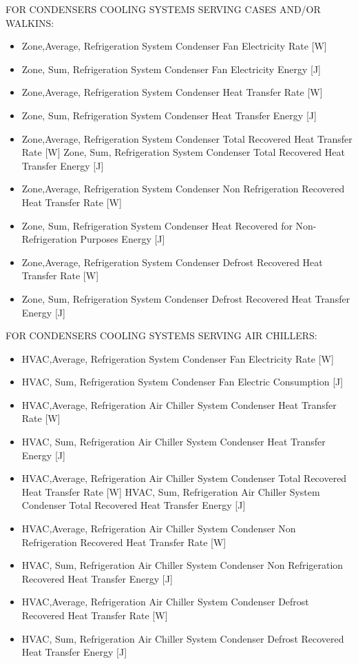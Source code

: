 FOR CONDENSERS COOLING SYSTEMS SERVING CASES AND/OR WALKINS:

\begin{itemize}
\item
  Zone,Average, Refrigeration System Condenser Fan Electricity Rate {[}W{]}
\item
  Zone, Sum, Refrigeration System Condenser Fan Electricity Energy {[}J{]}
\item
  Zone,Average, Refrigeration System Condenser Heat Transfer Rate {[}W{]}
\item
  Zone, Sum, Refrigeration System Condenser Heat Transfer Energy {[}J{]}
\item
  Zone,Average, Refrigeration System Condenser Total Recovered Heat Transfer Rate {[}W{]} Zone, Sum, Refrigeration System Condenser Total Recovered Heat Transfer Energy {[}J{]}
\item
  Zone,Average, Refrigeration System Condenser Non Refrigeration Recovered Heat Transfer Rate {[}W{]}
\item
  Zone, Sum, Refrigeration System Condenser Heat Recovered for Non-Refrigeration Purposes Energy {[}J{]}
\item
  Zone,Average, Refrigeration System Condenser Defrost Recovered Heat Transfer Rate {[}W{]}
\item
  Zone, Sum, Refrigeration System Condenser Defrost Recovered Heat Transfer Energy {[}J{]}
\end{itemize}

FOR CONDENSERS COOLING SYSTEMS SERVING AIR CHILLERS:

\begin{itemize}
\item
  HVAC,Average, Refrigeration System Condenser Fan Electricity Rate {[}W{]}
\item
  HVAC, Sum, Refrigeration System Condenser Fan Electric Consumption {[}J{]}
\item
  HVAC,Average, Refrigeration Air Chiller System Condenser Heat Transfer Rate {[}W{]}
\item
  HVAC, Sum, Refrigeration Air Chiller System Condenser Heat Transfer Energy {[}J{]}
\item
  HVAC,Average, Refrigeration Air Chiller System Condenser Total Recovered Heat Transfer Rate {[}W{]} HVAC, Sum, Refrigeration Air Chiller System Condenser Total Recovered Heat Transfer Energy {[}J{]}
\item
  HVAC,Average, Refrigeration Air Chiller System Condenser Non Refrigeration Recovered Heat Transfer Rate {[}W{]}
\item
  HVAC, Sum, Refrigeration Air Chiller System Condenser Non Refrigeration Recovered Heat Transfer Energy {[}J{]}
\item
  HVAC,Average, Refrigeration Air Chiller System Condenser Defrost Recovered Heat Transfer Rate {[}W{]}
\item
  HVAC, Sum, Refrigeration Air Chiller System Condenser Defrost Recovered Heat Transfer Energy {[}J{]}
\end{itemize}

